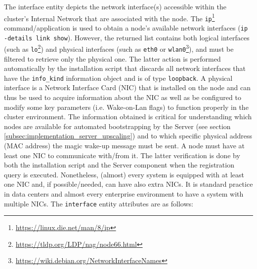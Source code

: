 The interface entity depicts the network interface(s) accessible within the
cluster's Internal Network that are associated with the node.
\newline
The \texttt{ip}\footnote{\url{https://linux.die.net/man/8/ip}} command/application
is used to obtain a node's available network interfaces (\texttt{ip -details
link show}). However, the returned list contains both logical interfaces (such as
\texttt{lo}\footnote{\url{https://tldp.org/LDP/nag/node66.html}}) and physical interfaces
(such as \texttt{eth0} or \texttt{wlan0}\footnote{\url{https://wiki.debian.org/NetworkInterfaceNames}}),
and must be filtered to retrieve only the physical one. The latter action is performed
automatically by the installation script that discards all network interfaces that
have the \texttt{info\_kind} information object and is of type \texttt{loopback}.
\newline
A physical interface is a Network Interface Card (NIC) that is installed on the
node and can thus be used to acquire information about the NIC as well as be
configured to modify some key parameters (i.e. Wake-on-Lan flags) to function properly
in the cluster environment. The information obtained is critical for
understanding which nodes are available for automated bootstrapping by the
Server (see section \ref{subsec:implementation_server_upscaling}) and to which
specific physical address (MAC address) the magic wake-up message must be sent.
\newline
A node must have at least one NIC to communicate with/from it. The latter
verification is done by both the installation script and the Server component
when the registration query is executed. Nonetheless, (almost) every system is
equipped with at least one NIC and, if possible/needed, can have also extra NICs.
It is standard practice in data centers and almost every enterprise environment to
have a system with multiple NICs.
\newline
The \texttt{interface} entity attributes are as follows:

